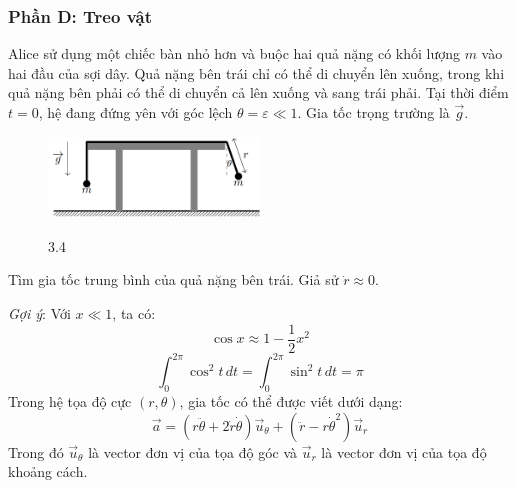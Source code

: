 \subsubsection*{Phần D: Treo vật}
\noindent Alice sử dụng một chiếc bàn nhỏ hơn và buộc hai quả nặng có khối lượng $m$ vào hai đầu của sợi dây. Quả nặng bên trái chỉ có thể di chuyển lên xuống, trong khi quả nặng bên phải có thể di chuyển cả lên xuống và sang trái phải. Tại thời điểm $t = 0$, hệ đang đứng yên với góc lệch $\theta = \varepsilon \ll 1$. Gia tốc trọng trường là $\vec{g}$.
\begin{figure}[H]
  \centering
  \includegraphics[width=0.5\textwidth]{Figures/Problems/Fig 3.4.png}
  \begin{center}
    \figurename{ 3.4}
  \end{center}
\end{figure}
\vspace{-0.5cm}
\noindent Tìm gia tốc trung bình của quả nặng bên trái. Giả sử $\dot{r} \approx 0$.

\noindent\textit{Gợi ý}: Với $x \ll 1$, ta có:
\begin{equation*}
  \cos x \approx 1 - \frac{1}{2}x^2
\end{equation*}
\begin{equation*}
  \int_0^{2\pi} \cos^2 t \, dt = \int_0^{2\pi} \sin^2 t \, dt = \pi
\end{equation*}
Trong hệ tọa độ cực $(r, \theta)$, gia tốc có thể được viết dưới dạng:
\begin{equation*}
  \vec{a} = \left(r\ddot{\theta} + 2\dot{r}\dot{\theta}\right)\vec{u}_\theta + \left(\ddot{r} - r\dot{\theta}^2\right)\vec{u}_r
\end{equation*}
\noindent Trong đó $\vec{u}_\theta$ là vector đơn vị của tọa độ góc và $\vec{u}_r$ là vector đơn vị của tọa độ khoảng cách.
